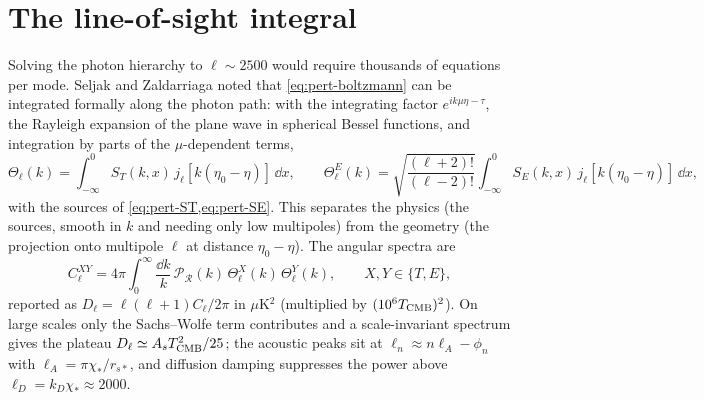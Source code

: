 \section{The line-of-sight integral}\label{sec:cmb-los}

Solving the photon hierarchy to $\ell\sim2500$ would require thousands of equations per mode. Seljak and Zaldarriaga
\cite{Seljak1996} noted that \cref{eq:pert-boltzmann} can be integrated formally along the photon path: with the
integrating factor $e^{ik\mu\eta-\tau}$, the Rayleigh expansion of the plane wave in spherical Bessel functions, and
integration by parts of the $\mu$-dependent terms,
\begin{equation}
\Theta_\ell(k)=\int_{-\infty}^0S_T(k,x)\,j_\ell[k(\eta_0-\eta)]\,\dd x,\qquad
\Theta^E_\ell(k)=\sqrt{\frac{(\ell+2)!}{(\ell-2)!}}\int_{-\infty}^0S_E(k,x)\,j_\ell[k(\eta_0-\eta)]\,\dd x,
\label{eq:cmb-los}
\end{equation}
with the sources of \cref{eq:pert-ST,eq:pert-SE}. This separates the physics (the sources, smooth in $k$ and needing
only low multipoles) from the geometry (the projection onto multipole $\ell$ at distance $\eta_0-\eta$). The angular
spectra are
\begin{equation}
C_\ell^{XY}=4\pi\int_0^\infty\frac{\dd k}{k}\,\mathcal P_\mathcal R(k)\,\Theta^X_\ell(k)\,\Theta^Y_\ell(k),\qquad
X,Y\in\{T,E\},
\label{eq:cmb-cl}
\end{equation}
reported as $D_\ell=\ell(\ell+1)C_\ell/2\pi$ in $\mu$K$^2$ (multiplied by $(10^6T_{\rm CMB})^2$). On large scales only
the Sachs--Wolfe term contributes and a scale-invariant spectrum gives the plateau $D_\ell\simeq A_sT_{\rm CMB}^2/25$;
the acoustic peaks sit at $\ell_n\approx n\ell_A-\phi_n$ with $\ell_A=\pi\chi_*/r_{s*}$, and diffusion damping
suppresses the power above $\ell_D=k_D\chi_*\approx2000$.

